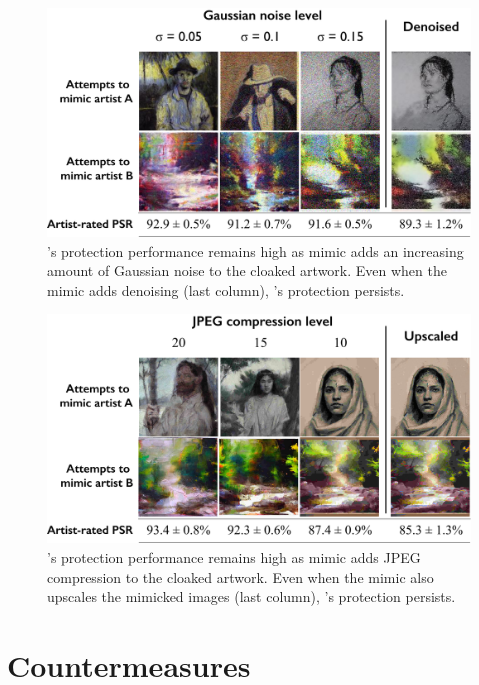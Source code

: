 \begin{figure}[t]
  \centering
  \includegraphics[width=1\columnwidth]{plots/counter/add-noise.pdf}
    \vspace{-0.25in}
  \caption{\system{}'s protection performance remains high as mimic adds an
    increasing amount of Gaussian noise to the cloaked artwork. Even when the
    mimic adds denoising (last column), \system{}'s protection persists. } 
  \label{fig:noise_countermeasure}
\end{figure}

\begin{figure}[t]
  \centering
  \includegraphics[width=1\columnwidth]{plots/counter/add-compression.pdf}
  \vspace{-0.25in}
  \caption{\system{}'s protection performance remains high as mimic adds JPEG compression to the cloaked artwork. Even when the mimic also upscales the mimicked images (last column), \system{}'s protection persists. }
  \label{fig:jpeg_countermeasure}
\end{figure}

\secspace
\section{Countermeasures} 
\label{sec:counter}

